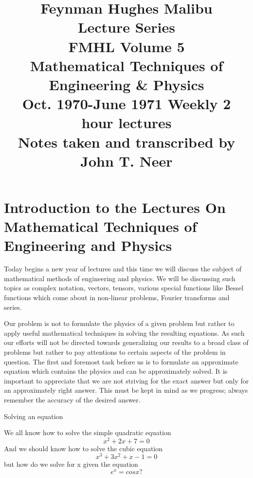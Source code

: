 \documentclass[a4paper,10pt]{article}
\begin{document}
\begin{titlepage} 

\title{{\LARGE \textbf{Feynman Hughes Malibu\\ Lecture Series}} \\
FMHL Volume 5\\
\textbf{Mathematical Techniques of \\ Engineering \& Physics}\\
Oct. 1970-June 1971
Weekly 2 hour lectures\\
Notes taken and transcribed by \\ John T. Neer}
\author{}
\date{}

\maketitle

\end{titlepage}

\renewcommand\contentsname{Lecture}
\tableofcontents
\pagebreak

\section{Introduction to the Lectures On Mathematical Techniques of Engineering and Physics}

Today begins a new year of lectures and this time we will discuss the subject of mathematical methods of engineering and physics.
 We will be discussing such topics as complex
 notation, vectors, tensors, various special functions like Bessel functions which come about in non-linear problems, Fourier transforms
and series. 

Our problem is not to formulate the physics of a given problem but rather to apply useful mathematical techniques in solving
the resulting equations.  As such our efforts will not be directed towards generalizing our results to a broad class of problems
but rather to pay attentions to certain aspects of the problem in question. The first and foremost task before us is to formulate
an approximate equation which contains the physics and can be approximately solved. It is important to appreciate that we are 
not striving for the exact answer but only for an approximately right answer.  This must be kept in mind as we progress; always 
remember the accuracy of the desired answer.

\begin{center}
 Solving an equation

We all know how to solve the simple quadratic equation
$$ x^2+2x+7=0$$
And we should know how to solve the cubic equation
$$x^3+3x^2+x-1=0$$
but how do we solve for x given the equation
$$e^x=cosx?$$
\end{center}
\end{document}
